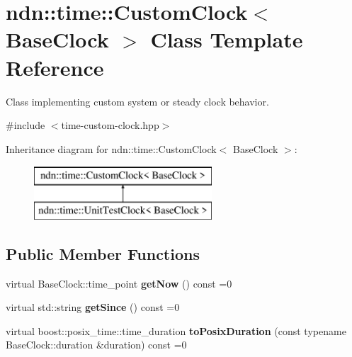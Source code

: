 \hypertarget{classndn_1_1time_1_1CustomClock}{}\section{ndn\+:\+:time\+:\+:Custom\+Clock$<$ Base\+Clock $>$ Class Template Reference}
\label{classndn_1_1time_1_1CustomClock}


Class implementing custom system or steady clock behavior.  




{\ttfamily \#include $<$time-\/custom-\/clock.\+hpp$>$}

Inheritance diagram for ndn\+:\+:time\+:\+:Custom\+Clock$<$ Base\+Clock $>$\+:\begin{figure}[H]
\begin{center}
\leavevmode
\includegraphics[height=2.000000cm]{classndn_1_1time_1_1CustomClock}
\end{center}
\end{figure}
\subsection*{Public Member Functions}
\begin{DoxyCompactItemize}
\item 
virtual Base\+Clock\+::time\+\_\+point {\bfseries get\+Now} () const =0\hypertarget{classndn_1_1time_1_1CustomClock_ad19dfe892b5d6705fb13625bc91a83e0}{}\label{classndn_1_1time_1_1CustomClock_ad19dfe892b5d6705fb13625bc91a83e0}

\item 
virtual std\+::string {\bfseries get\+Since} () const =0\hypertarget{classndn_1_1time_1_1CustomClock_ab98d3289435a235568a06a6133c457ff}{}\label{classndn_1_1time_1_1CustomClock_ab98d3289435a235568a06a6133c457ff}

\item 
virtual boost\+::posix\+\_\+time\+::time\+\_\+duration {\bfseries to\+Posix\+Duration} (const typename Base\+Clock\+::duration \&duration) const =0\hypertarget{classndn_1_1time_1_1CustomClock_aa9bc19a1db5ee353d21c3b94b552eb6a}{}\label{classndn_1_1time_1_1CustomClock_aa9bc19a1db5ee353d21c3b94b552eb6a}

\end{DoxyCompactItemize}


